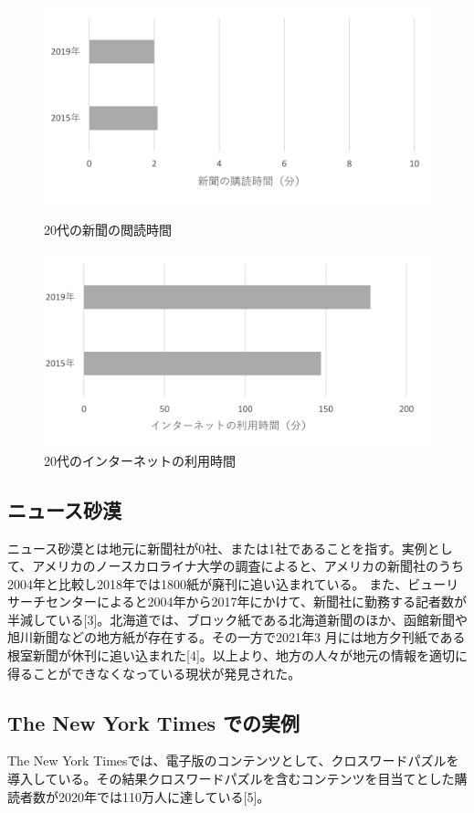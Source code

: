 \begin{figure}[htbp]
    \begin{minipage}[b]{0.45\linewidth}
        \centering
        \includegraphics[keepaspectratio, scale=0.75]{images/newspaper3.png}
        \caption{20代の新聞の閲読時間 }
    \end{minipage}
    \begin{minipage}[b]{0.45\linewidth}
        \centering
        \includegraphics[keepaspectratio, scale=0.75]{images/newspaper2.png}
        \caption{20代のインターネットの利用時間}
    \end{minipage}
\end{figure}

\subsection{ニュース砂漠}
ニュース砂漠とは地元に新聞社が0社、または1社であることを指す。実例として、アメリカのノースカロライナ大学の調査によると、アメリカの新聞社のうち2004年と比較し2018年では1800紙が廃刊に追い込まれている。 また、ビューリサーチセンターによると2004年から2017年にかけて、新聞社に勤務する記者数が半減している[3]。北海道では、ブロック紙である北海道新聞のほか、函館新聞や旭川新聞などの地方紙が存在する。その一方で2021年3 月には地方夕刊紙である根室新聞が休刊に追い込まれた[4]。以上より、地方の人々が地元の情報を適切に得ることができなくなっている現状が発見された。

\subsection{The New York Times での実例}
The New York Timesでは、電子版のコンテンツとして、クロスワードパズルを導入している。その結果クロスワードパズルを含むコンテンツを目当てとした購読者数が2020年では110万人に達している[5]。
